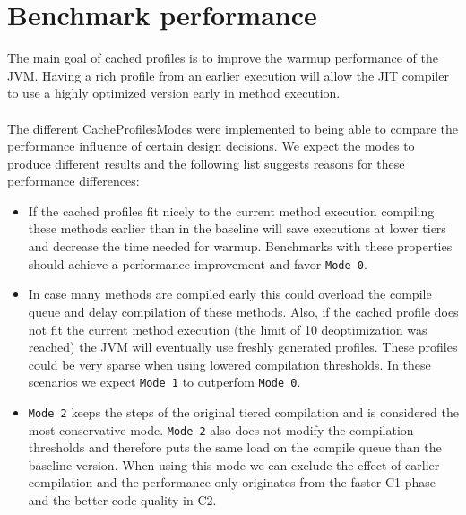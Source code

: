 \section{Benchmark performance}
\label{s:perf_benchmark}
The main goal of cached profiles is to improve the warmup performance of the JVM. Having a rich profile from an earlier execution will allow the JIT compiler to use a highly optimized version early in method execution.
\\\\
The different CacheProfilesModes were implemented to being able to compare the performance influence of certain design decisions. We expect the modes to produce different results and the following list suggests reasons for these performance differences:
\begin{itemize}
  \item If the cached profiles fit nicely to the current method execution compiling these methods earlier than in the baseline will save executions at lower tiers and decrease the time needed for warmup. Benchmarks with these properties should achieve a performance improvement and favor \texttt{Mode 0}.
  \item In case many methods are compiled early this could overload the compile queue and delay compilation of these methods. Also, if the cached profile does not fit the current method execution (the limit of 10 deoptimization was reached) the JVM will eventually use freshly generated profiles. These profiles could be very sparse when using lowered compilation thresholds. In these scenarios we expect \texttt{Mode 1} to outperfom \texttt{Mode 0}.
  \item \texttt{Mode 2} keeps the steps of the original tiered compilation and is considered the most conservative mode. \texttt{Mode 2} also does not modify the compilation thresholds and therefore puts the same load on the compile queue than the baseline version. When using this mode we can exclude the effect of earlier compilation and the performance only originates from the faster C1 phase and the better code quality in C2.
\end{itemize}

